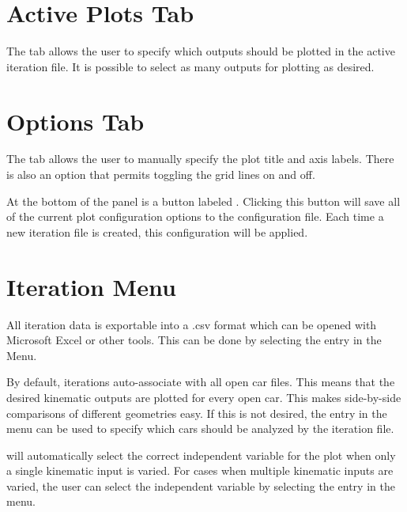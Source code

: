 \section{Active Plots Tab} \label{sec:activePlotsTab}

The  tab allows the user to specify which outputs should be plotted in the active iteration file.  It is possible to select as many outputs for plotting as desired.

\section{Options Tab} \label{sec:optionsTab}

The  tab allows the user to manually specify the plot title and axis labels.  There is also an option that permits toggling the grid lines on and off.

At the bottom of the panel is a button labeled .  Clicking this button will save all of the current plot configuration options to the configuration file.  Each time a new iteration file is created, this configuration will be applied.

\section{Iteration Menu} \label{sec:iterationMenu}

All iteration data is exportable into a .csv format which can be opened with Microsoft Excel or other tools.  This can be done by selecting the  entry in the  Menu.

By default, iterations auto-associate with all open car files.  This means that the desired kinematic outputs are plotted for every open car.  This makes side-by-side comparisons of different geometries easy.  If this is not desired, the  entry in the  menu can be used to specify which cars should be analyzed by the iteration file.

\vvase{} will automatically select the correct independent variable for the plot when only a single kinematic input is varied.  For cases when multiple kinematic inputs are varied, the user can select the independent variable by selecting the  entry in the  menu.
